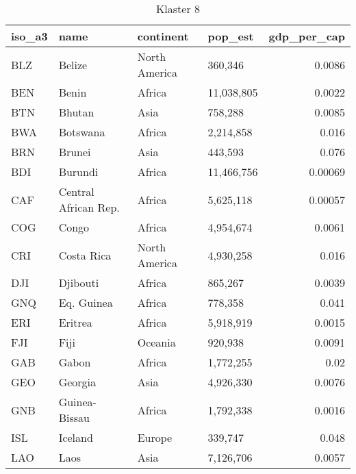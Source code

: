 \begin{table}
    \centering
    \caption{Klaster 8}
    \label{tab:cl8}
    \begin{tabular}{llllr}
        \toprule
        iso\_a3 & name                 & continent     & pop\_est   & gdp\_per\_cap \\
        \midrule
        BLZ     & Belize               & North America & 360,346    & 0.0086        \\
        BEN     & Benin                & Africa        & 11,038,805 & 0.0022        \\
        BTN     & Bhutan               & Asia          & 758,288    & 0.0085        \\
        BWA     & Botswana             & Africa        & 2,214,858  & 0.016         \\
        BRN     & Brunei               & Asia          & 443,593    & 0.076         \\
        BDI     & Burundi              & Africa        & 11,466,756 & 0.00069       \\
        CAF     & Central African Rep. & Africa        & 5,625,118  & 0.00057       \\
        COG     & Congo                & Africa        & 4,954,674  & 0.0061        \\
        CRI     & Costa Rica           & North America & 4,930,258  & 0.016         \\
        DJI     & Djibouti             & Africa        & 865,267    & 0.0039        \\
        GNQ     & Eq. Guinea           & Africa        & 778,358    & 0.041         \\
        ERI     & Eritrea              & Africa        & 5,918,919  & 0.0015        \\
        FJI     & Fiji                 & Oceania       & 920,938    & 0.0091        \\
        GAB     & Gabon                & Africa        & 1,772,255  & 0.02          \\
        GEO     & Georgia              & Asia          & 4,926,330  & 0.0076        \\
        GNB     & Guinea-Bissau        & Africa        & 1,792,338  & 0.0016        \\
        ISL     & Iceland              & Europe        & 339,747    & 0.048         \\
        LAO     & Laos                 & Asia          & 7,126,706  & 0.0057        \\

\end{tabular}
\end{table}
